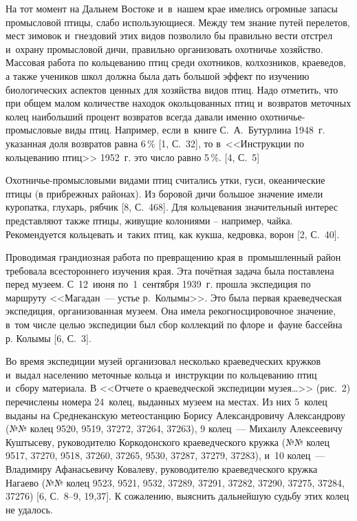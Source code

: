 На тот момент на Дальнем Востоке и~в~нашем крае имелись огромные запасы промысловой птицы, слабо использующиеся. Между тем знание путей перелетов, мест зимовок и~гнездовий этих видов позволило бы правильно вести отстрел и~охрану промысловой дичи, правильно организовать охотничье хозяйство. Массовая работа по кольцеванию птиц среди охотников, колхозников, краеведов, а также учеников школ должна была дать большой эффект по изучению биологических аспектов ценных для хозяйства видов птиц. Надо отметить, что при общем малом количестве находок окольцованных птиц и~возвратов меточных колец наибольший процент возвратов всегда давали именно охотничье-промысловые виды птиц. Например, если в~книге С.~А.~Бутурлина 1948~г. указанная доля возвратов равна 6\,\% [1, С.~32], то в~<<Инструкции по кольцеванию птиц>> 1952~г. это число равно 5\,\%.  [4, С.~5]

Охотничье-промысловыми видами птиц считались утки, гуси, океанические птицы (в прибрежных районах). Из боровой дичи большое значение имели куропатка, глухарь, рябчик [8, С.~468]. Для кольцевания значительный интерес представляют также птицы, живущие колониями – например, чайка. Рекомендуется кольцевать и~таких птиц, как кукша, кедровка, ворон [2, С.~40].

Проводимая грандиозная работа по превращению края в~промышленный район требовала всестороннего изучения края. Эта почётная задача была поставлена перед музеем. С~12~июня по~1~сентября 1939~г. прошла экспедиция по маршруту <<Магадан~--- устье р.~Колымы>>. Это была первая краеведческая экспедиция, организованная музеем. Она имела рекогносцировочное значение, в~том числе целью экспедиции был сбор коллекций по флоре и~фауне бассейна р. Колымы [6, С.~3].

Во время экспедиции музей организовал несколько краеведческих кружков и~выдал населению меточные кольца и~инструкции по кольцеванию птиц и~сбору материала. В <<Отчете о краеведческой экспедиции музея\dots>> (рис.~2) перечислены номера 24~колец, выданных музеем на местах. Из них 5~колец выданы на Среднеканскую метеостанцию Борису Александровичу Александрову (№№ колец 9520, 9519, 37272, 37264, 37263), 9 колец~--- Михаилу Алексеевичу Куштысеву, руководителю Коркодонского краеведческого кружка (№№ колец 9517, 37270, 9518, 37260, 37265, 9530, 37287, 37279, 37283), и~10 колец~--- Владимиру Афанасьевичу Ковалеву, руководителю краеведческого кружка Нагаево (№№ колец 9523, 9521, 9532, 37289, 37291, 37282, 37290, 37275, 37284, 37276) [6, С.~8--9, 19,37]. К сожалению, выяснить дальнейшую судьбу этих колец не удалось.

